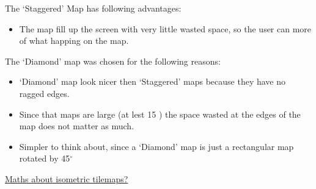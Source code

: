 The `Staggered' Map has following advantages:
\begin{itemize}
	\item The map fill up the screen with very little wasted space, so the user can more of what happing on the map.
\end{itemize} 

The `Diamond' map was chosen for the following reasons:
\begin{itemize}
	\item `Diamond' map look nicer then `Staggered' maps because they have no ragged edges.
	\item Since that maps are large (at lest 15 ) the space wasted at the edges of the map does not matter as much.
	\item Simpler to think about, since a `Diamond' map is just a rectangular map rotated by 45$^{\circ}$
\end{itemize}

\underline{Maths about isometric tilemaps? }